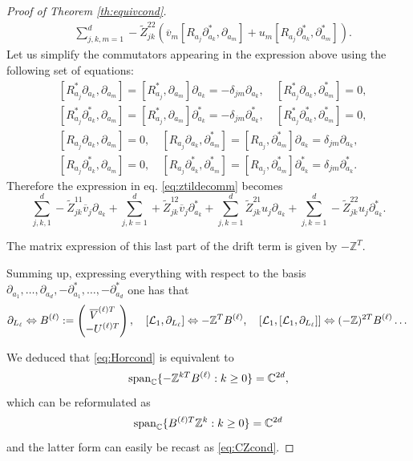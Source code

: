 \documentclass[preprint]{elsarticle}
\theoremstyle{definition}
\def\CC{\mathbb{C}}
\begin{document}
\begin{proof}[Proof of Theorem \ref{th:equivcond}]
\begin{equation}
\begin{split}
        &\sum_{j,k,m=1}^{d} -\widetilde{Z}^{22}_{jk}(\overline{v}_m[R_{a_j}\partial^*_{a_k},\partial_{a_m}]+u_m[R_{a_j}\partial^*_{a_k},\partial^*_{a_m}]).
    \end{split}\end{equation}
    Let us simplify the commutators appearing in the expression above using the following set of equations:
   \begin{align*}
       &[R_{a_j}^*\partial_{a_k},\partial_{a_m}]=[R_{a_j}^*,\partial_{a_m}]\partial_{a_k}=-\delta_{jm}\partial_{a_k}, \quad [R_{a_j}^*\partial_{a_k},\partial^*_{a_m}]=0,\\
    &[R_{a_j}^*\partial^*_{a_k},\partial_{a_m}]=[R_{a_j}^*,\partial_{a_m}]\partial^*_{a_k}=-\delta_{jm}\partial^*_{a_k}, \quad [R_{a_j}^*\partial^*_{a_k},\partial^*_{a_m}]=0,\\
    &[R_{a_j}\partial_{a_k},\partial_{a_m}]=0, \quad [R_{a_j}\partial_{a_k},\partial^*_{a_m}]=[R_{a_j},\partial^*_{a_m}]\partial_{a_k}=\delta_{jm}\partial_{a_k},\\
    &[R_{a_j}\partial^*_{a_k},\partial_{a_m}]=0, \quad [R_{a_j}\partial^*_{a_k},\partial^*_{a_m}]=[R_{a_j},\partial^*_{a_m}]\partial^*_{a_k}=\delta_{jm}\partial^*_{a_k}.
    \end{align*}
    Therefore the expression in eq. \eqref{eq:ztildecomm} becomes
    \[
     \sum_{j,k,1}^{d} -\widetilde{Z}^{11}_{jk}\overline{v}_j\partial_{a_k}+\sum_{j,k=1}^{d} +\widetilde{Z}^{12}_{jk}\overline{v}_j\partial^*_{a_k}+\sum_{j,k=1}^{d} \widetilde{Z}^{21}_{jk}u_j \partial_{a_k}+\sum_{j,k=1}^{d}- \widetilde{Z}^{22}_{jk}u_j\partial^*_{a_k}.
    \]

The matrix expression of this last part of the drift term is given by $-\mathbb{Z}^T.$ 

Summing up, expressing everything with respect to the basis $\partial_{a_1}, \dots, \partial_{a_d}, -\partial_{a_1}^*, \dots, -\partial_{a_d}^*$ one has that
$$\partial_{L_\ell} \Leftrightarrow B^{(\ell)}:=\begin{pmatrix}{\overline{V}^{(\ell)T}}\\ -U^{(\ell)T} \end{pmatrix}, \quad  [{\cal L}_1,\partial_{L_\ell}]\Leftrightarrow-\mathbb{Z}^TB^{(\ell)}, \quad [{\cal L}_1,[{\cal L}_1,\partial_{L_\ell}]]\Leftrightarrow(-\mathbb{Z})^{2T}B^{(\ell)}\dots $$

We deduced that \eqref{eq:Horcond} is equivalent to
$${\rm span}_{\CC}\{-\mathbb{Z}^{kT}B^{(\ell)}: k \geq 0\}=\CC^{2d},$$
which can be reformulated as
$${\rm span}_{\CC}\{B^{(\ell)T}\mathbb{Z}^{k}: k \geq 0\}=\CC^{2d}$$
and the latter form can easily be recast as \eqref{eq:CZcond}.
\end{proof}
\end{document}
